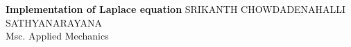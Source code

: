 
\begin{titlepage}

\textbf{{\Huge 	Implementation of Laplace equation
				 }} 
\vfill
{\Large SRIKANTH CHOWDADENAHALLI SATHYANARAYANA} \setlength{\parskip}{2.9cm}\\
Msc. Applied Mechanics\\





\end{titlepage}









